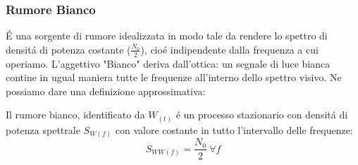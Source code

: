         \subsubsection{Rumore Bianco}
            É una sorgente di rumore idealizzata in modo tale da rendere lo spettro di densitá di potenza costante ($\frac{N_0}{2}$), cioé indipendente
            dalla frequenza a cui operiamo. L'aggettivo "Bianco" deriva dall'ottica: un segnale di luce bianca contine in ugual maniera tutte le frequenze
             all'interno dello spettro visivo. Ne possiamo dare una definizione approssimativa:
             \begin{center}
                Il rumore bianco, identificato da $W_{(t)}$ é un processo stazionario con densitá di potenza spettrale $S_{W(f)}$ con valore
                costante in tutto l'intervallo delle frequenze:
                \[
                    S_{WW(f)} = \frac{N_0}{2}\ \forall f  
                \]
             \end{center}
